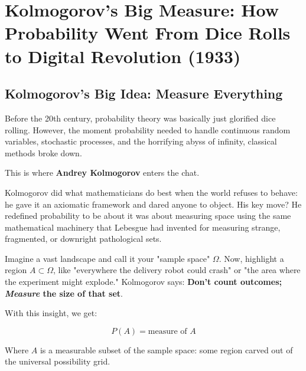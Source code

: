 \section{Kolmogorov's Big Measure: How Probability Went From Dice Rolls to Digital Revolution (1933)}

\subsection{Kolmogorov's Big Idea: Measure Everything}

Before the 20th century, probability theory was basically just glorified dice rolling. However, the moment probability needed to handle continuous random variables, stochastic processes, and the horrifying abyss of infinity, classical methods broke down. 

This is where \textbf{Andrey Kolmogorov} enters the chat. 

Kolmogorov did what mathematicians do best when the world refuses to behave: he gave it an axiomatic framework and dared anyone to object. His key move? He redefined probability to be about it was about measuring space using the same mathematical machinery that Lebesgue had invented for measuring strange, fragmented, or downright pathological sets.

Imagine a vast landscape and call it your "sample space" \( \Omega \). Now, highlight a region \( A \subset \Omega \), like "everywhere the delivery robot could crash" or "the area where the experiment might explode." Kolmogorov says: \textbf{Don’t count outcomes; \textit{Measure} the size of that set}. 

With this insight, we get:

\[
P(A) = \text{measure of } A
\]

Where \( A \) is a measurable subset of the sample space: some region carved out of the universal possibility grid. 

